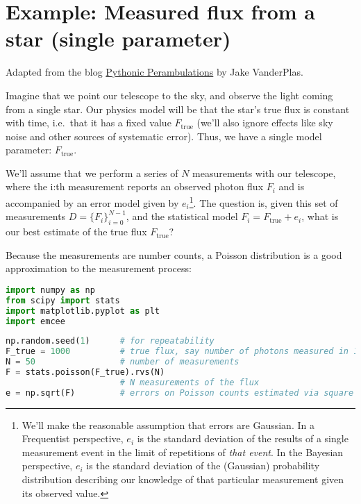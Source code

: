 \documentclass[%
oneside,                 %
final,                   %
10pt]{article}
\begin{document}
\section{Example: Measured flux from a star (single parameter)}
Adapted from the blog \href{{http://jakevdp.github.io}}{Pythonic Perambulations} by Jake VanderPlas.

Imagine that we point our telescope to the sky, and observe the light coming from a single star. Our physics model will be that the star's true flux is constant with time, i.e.~that  it has a fixed value $F_\mathrm{true}$ (we'll also ignore effects like sky noise and other sources of systematic error). Thus, we have a single model parameter: $F_\mathrm{true}$.

We'll assume that we perform a series of $N$ measurements with our telescope, where the i:th measurement reports an observed photon flux $F_i$ and is accompanied by an error model given by $e_i$\footnote{We'll make the reasonable assumption that errors are Gaussian. In a Frequentist perspective, $e_i$ is the standard deviation of the results of a single measurement event in the limit of repetitions of \emph{that event}. In the Bayesian perspective, $e_i$ is the standard deviation of the (Gaussian) probability distribution describing our knowledge of that particular measurement given its observed value.}.
The question is, given this set of measurements $D = \{F_i\}_{i=0}^{N-1}$, and the statistical model $F_i = F_\mathrm{true} + e_i$, what is our best estimate of the true flux $F_\mathrm{true}$?



Because the measurements are number counts, a Poisson distribution is a good approximation to the measurement process:

\begin{lstlisting}[language=Python,style=blue1]
import numpy as np
from scipy import stats
import matplotlib.pyplot as plt
import emcee
\end{lstlisting}

\begin{lstlisting}[language=Python,style=blue1]
np.random.seed(1)      # for repeatability
F_true = 1000          # true flux, say number of photons measured in 1 second
N = 50                 # number of measurements
F = stats.poisson(F_true).rvs(N)
                       # N measurements of the flux
e = np.sqrt(F)         # errors on Poisson counts estimated via square root
\end{lstlisting}
\end{document}
